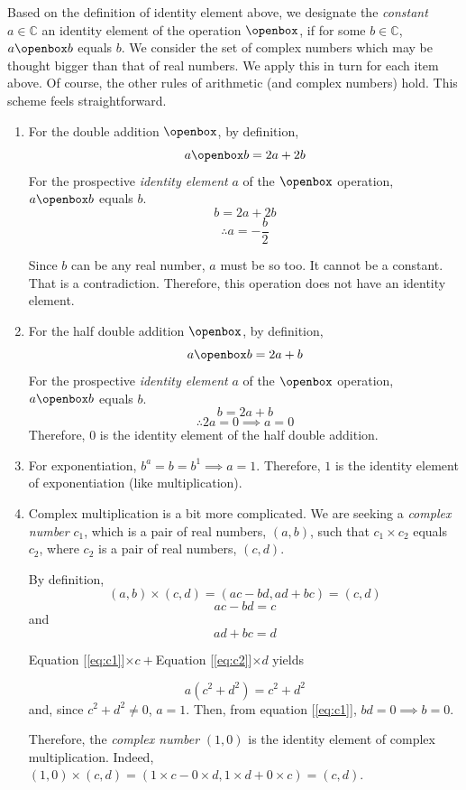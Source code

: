 \documentclass[english,notitlepage,smartquotes]{hgbreport}
\theoremstyle{definition}
\theoremstyle{definition}
\theoremstyle{remark}
\theoremstyle{plain}
\theoremstyle{definition}
\theoremstyle{definition}
\begin{document}
Based on the definition of identity element above, we designate the \emph{constant} $a\in\mathbb{C}$ an identity element of the operation $\openbox$, if for some $b\in\mathbb{C}$, $a\openbox b$ equals $b$. We consider the set of complex numbers which may be thought bigger than that of real numbers. We apply this in turn for each item above. Of course, the other rules of arithmetic (and complex numbers) hold. This scheme feels straightforward.
\begin{enumerate}
\item For the double addition $\openbox$, by definition,
$$
a\openbox b=2a+2b
$$
For the prospective \emph{identity element} $a$ of the $\openbox$ operation, $a\openbox b$ equals $b$.
$$
b=2a+2b
$$
$$
\therefore a=-\frac{b}{2}
$$

Since $b$ can be any real number, $a$ must be so too. It cannot be a constant. That is a contradiction. Therefore, this operation does not have an identity element.
\item For the half double addition $\openbox$, by definition,
$$
a\openbox b=2a+b
$$
For the prospective \emph{identity element} $a$ of the $\openbox$ operation, $a\openbox b$ equals $b$.
$$
b=2a+b
$$
$$
\therefore 2a=0\implies a=0
$$
Therefore, $0$ is the identity element of the half double addition. 
\item For exponentiation, $b^a=b=b^1\implies a=1$. Therefore, $1$ is the identity element of exponentiation (like multiplication).
\item Complex multiplication is a bit more complicated. We are seeking a \emph{complex number} $c_1$, which is a pair of real numbers, $(a,b)$, such that $c_1\times c_2$ equals $c_2$, where $c_2$ is a pair of real numbers, $(c,d)$.

By definition,
$$
(a,b)\times(c,d)=(ac-bd,ad+bc)=(c,d)
$$
\begin{equation}
\label{eq:c1}
ac-bd=c
\end{equation}
and
\begin{equation}
\label{eq:c2}
ad+bc=d
\end{equation}

Equation [\ref{eq:c1}]$\times c+$Equation [\ref{eq:c2}]$\times d$ yields

$$
a(c^2+d^2)=c^2+d^2
$$
and, since $c^2+d^2\ne 0$, $a=1$. Then, from equation [\ref{eq:c1}], $bd=0\implies b=0$.

Therefore, the \emph{complex number} $(1,0)$ is the identity element of complex multiplication. Indeed, $(1,0)\times(c,d)=(1\times c-0\times d,1\times d+0\times c)=(c,d)$.


\end{enumerate}
\end{document}
